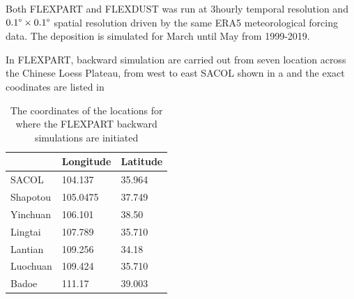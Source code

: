 \begin{table}[htpb]
\caption{The model sensitivity experiments that have been performed}
\centering

\end{table}

Both FLEXPART and FLEXDUST was run at 3hourly temporal resolution and $0.1\degree \times 0.1\degree$ spatial resolution driven by the same ERA5 meteorological forcing data. The deposition is simulated for March until May from 1999-2019. 

In FLEXPART, backward simulation are carried out from seven location across the Chinese Loess Plateau, from west to east SACOL shown in a and the exact coodinates are listed in 

\begin{table}[htpb]
\caption{The coordinates of the locations for where the FLEXPART backward simulations are initiated}
\centering
\label{tab:coordinates_clp}
\begin{tabular}{@{}lll@{}}
\toprule
 & Longitude & Latitude \\ \midrule
SACOL & 104.137 & 35.964 \\
Shapotou  & 105.0475 & 37.749  \\
Yinchuan & 106.101 & 38.50 \\
Lingtai & 107.789 &  35.710\\
Lantian & 109.256 & 34.18 \\
Luochuan & 109.424 &  35.710\\
Badoe & 111.17  &  39.003  \\ \bottomrule
\end{tabular}
\end{table}

